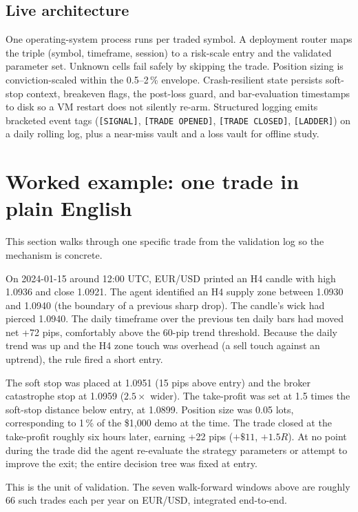 \documentclass[11pt,a4paper]{article}
\begin{document}
\subsection{Live architecture}

One operating-system process runs per traded symbol. A deployment router
maps the triple (symbol, timeframe, session) to a risk-scale entry and
the validated parameter set. Unknown cells fail safely by skipping the
trade. Position sizing is conviction-scaled within the 0.5--2\,\%
envelope. Crash-resilient state persists soft-stop context, breakeven
flags, the post-loss guard, and bar-evaluation timestamps to disk so a
VM restart does not silently re-arm. Structured logging emits bracketed
event tags (\texttt{[SIGNAL]}, \texttt{[TRADE OPENED]}, \texttt{[TRADE
CLOSED]}, \texttt{[LADDER]}) on a daily rolling log, plus a near-miss
vault and a loss vault for offline study.

\section{Worked example: one trade in plain English}\label{sec:worked}

This section walks through one specific trade from the validation log
so the mechanism is concrete.

On 2024-01-15 around 12:00 UTC, EUR/USD printed an H4 candle with high
1.0936 and close 1.0921. The agent identified an H4 supply zone
between 1.0930 and 1.0940 (the boundary of a previous sharp drop). The
candle's wick had pierced 1.0940. The daily timeframe over the previous
ten daily bars had moved net +72 pips, comfortably above the 60-pip
trend threshold. Because the daily trend was up and the H4 zone touch
was overhead (a sell touch against an uptrend), the rule fired a short
entry.

The soft stop was placed at 1.0951 (15 pips above entry) and the broker
catastrophe stop at 1.0959 ($2.5 \times$ wider). The take-profit was set
at 1.5 times the soft-stop distance below entry, at 1.0899. Position
size was 0.05 lots, corresponding to 1\,\% of the \$1{,}000 demo at the
time. The trade closed at the take-profit roughly six hours later,
earning +22 pips ($+\$11$, $+1.5R$). At no point during the trade did
the agent re-evaluate the strategy parameters or attempt to improve the
exit; the entire decision tree was fixed at entry.

This is the unit of validation. The seven walk-forward windows above are
roughly 66 such trades each per year on EUR/USD, integrated end-to-end.
\end{document}

